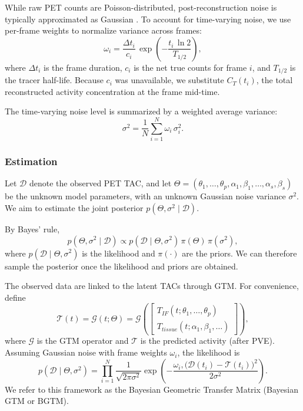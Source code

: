 While raw PET counts are Poisson-distributed, post-reconstruction noise is typically approximated as Gaussian \cite{TODO}.
To account for time-varying noise, we use per-frame weights to normalize variance across frames: %
\begin{equation}
	\omega_{i} = \frac{\Delta t_i}{c_i}\,\exp\!\left(-\frac{t_{i}\,\ln 2}{T_{1/2}}\right),
\end{equation}
where \(\Delta t_i\) is the frame duration, \(c_i\) is the net true counts for frame \(i\), and \(T_{1/2}\) is the tracer half-life.
Because \(c_i\) was unavailable, we substitute \(C_T(t_i)\), the total reconstructed activity concentration at the frame mid-time.

The time-varying noise level is summarized by a weighted average variance:
\begin{equation}
	\sigma^2 = \frac{1}{N} \sum_{i=1}^{N} \omega_i\,\sigma_i^2.
\end{equation}

\subsubsection{Estimation}
Let \(\mathcal{D}\) denote the observed PET TAC, and let \( \Theta = (\theta_{1}, \dots,\theta_{p}, \alpha_{1}, \beta_{1}, \dots, \alpha_{s}, \beta_{s}) \) be the unknown model parameters, with an unknown Gaussian noise variance \(\sigma^2\).
We aim to estimate the joint posterior \(p(\Theta,\sigma^2\mid \mathcal{D})\).

By Bayes’ rule,
\begin{equation}\label{eq:posterior} %
	p(\Theta,\sigma^2 \mid \mathcal{D}) \propto p(\mathcal{D} \mid \Theta,\sigma^2)\,\pi( \Theta )\,\pi( \sigma^2),
\end{equation}
where \(p(\mathcal{D} \mid \Theta,\sigma^2)\) is the likelihood and \(\pi(\cdot)\) are the priors.
We can therefore sample the posterior once the likelihood and priors are obtained.

The observed data are linked to the latent TACs through GTM.
For convenience, define
\begin{equation}
	\mathcal{T}(t) = \mathcal{G}(t;\Theta) =
	\mathcal{G}\!\left(
	\begin{bmatrix}
			T_{IF}(t;\theta_{1}, \dots, \theta_{p}) \\
			T_{tissue}(t;\alpha_{1}, \beta_{1}, \dots)
		\end{bmatrix}\right),
\end{equation}
where \(\mathcal{G}\) is the GTM operator and \(\mathcal{T}\) is the predicted activity (after PVE).
Assuming Gaussian noise with frame weights \(\omega_i\), the likelihood is
\begin{equation}
	p(\mathcal{D} \mid \Theta,\sigma^2) = \prod_{i=1}^N \frac{1}{\sqrt{2\pi \sigma^2}} \exp\!\left( -\frac{\omega_i,\bigl(\mathcal{D}(t_i) - \mathcal{T}(t_i)\bigr)^2}{2\sigma^2} \right).
\end{equation}
We refer to this framework as the Bayesian Geometric Transfer Matrix (Bayesian GTM or BGTM).

